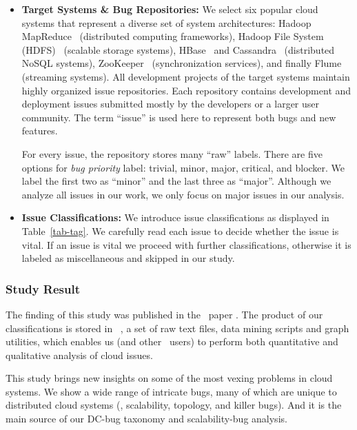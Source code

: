 \begin{itemize}

\item {\bf Target Systems \& Bug Repositories:} We select six popular cloud
systems that represent a diverse set of system architectures: Hadoop
MapReduce~\cite{HadoopWeb} (distributed computing frameworks), Hadoop File
System (HDFS)~\cite{HDFSArchitecture} (scalable storage systems),
HBase~\cite{HBaseWeb} and Cassandra~\cite{CassandraWeb} (distributed NoSQL
systems), ZooKeeper~\cite{ZooKeeperWeb} (synchronization services), and finally
Flume~\cite{FlumeWeb} (streaming systems).
%
All development projects of the target systems maintain highly organized issue
repositories.
%
Each repository contains development and deployment issues submitted mostly by
the developers or a larger user community. The term ``issue'' is used here to
represent both bugs and new features.

For every issue, the repository stores many ``raw'' labels. There are five
options for {\em bug priority} label: trivial, minor, major, critical, and
blocker. We label the first two as ``minor'' and the last three as ``major''.
Although we analyze all issues in our work, we only focus on major issues in
our analysis.
\fi

\item {\bf Issue Classifications:} We introduce issue classifications as
displayed in Table~\ref{tab-tag}. 
%
We carefully read each issue to decide whether the issue is vital. If an issue
is vital we proceed with further classifications, otherwise it is labeled as
miscellaneous and skipped in our study. 

\end{itemize}

\subsubsection{Study Result}

The finding of this study was published in the \cbs\ paper
\cite{Gunawi+14-Cbs}.  The product of our classifications is stored in \cdb\
\cite{CBSWeb}, a set of raw text files, data mining scripts and graph utilities,
which enables us (and other \cdb\ users) to perform both quantitative and
qualitative analysis of cloud issues. 

This study brings new insights on some of the most vexing problems in cloud
systems. We show a wide range of intricate bugs, many of which are unique to
distributed cloud systems (\eg, scalability, topology, and killer bugs). And it
is the main source of our DC-bug taxonomy and scalability-bug analysis.

